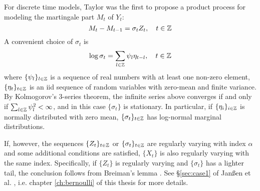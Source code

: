For discrete time models, Taylor \cite{taylor:1982} was the first to
propose a product process for modeling the martingale part $M_t$ of
$Y_t$:
\[
M_t - M_{t-1}= \sigma_t Z_t, \quad t \in \mathbb Z
\]
A convenient choice of $\sigma_t$ is
\begin{equation}
  \label{eq:rfht}
  \log\sigma_t = \sum_{l \in \mathbb Z} \psi_l \eta_{t-l},
  \quad
  t \in \mathbb Z
\end{equation}
where $\{\psi_l\}_{l \in \mathbb Z}$ is a sequence of real numbers
with at least one non-zero element,
$\{\eta_t\}_{t \in \mathbb Z}$ is an iid sequence of random
variables with zero-mean and finite variance.
By Kolmogorov's 3-series theorem, the infinite series above
converges if and only if $\sum_{l \in \mathbb Z} \psi_l^2 < \infty$,
and in this case $\{\sigma_{t}\}$ is stationary.
In particular, if $\{\eta_i\}_{i \in \mathbb Z}$ is normally
distributed with zero mean, $\{\sigma_t\}_{t \in \mathbb Z}$ has
log-normal marginal distributions.

If, however, the sequences $\{Z_t\}_{t \in \mathbb Z}$ or
$\{\sigma_t\}_{t \in \mathbb Z}$ are regularly varying with index
$\alpha$ and some additional conditions are satisfied, $\{X_t\}$
is also regularly varying with the same index. Specifically,
if $\{Z_t\}$ is regularly varying and $\{\sigma_t\}$ has a lighter
tail, the conclusion follows from Breiman's lemma \cite{breiman:1965}.
See \S\ref{sec:case1} of Jan\ss en et
al. \cite{janssen:mikosch:rezapour:xie:2016}, i.e. chapter
\ref{ch:bernoulli} of this thesis for more details. 


